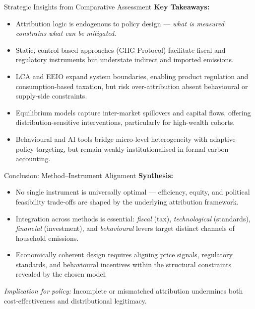 \documentclass{beamer}
\begin{document}
\begin{frame}{Strategic Insights from Comparative Assessment}
\footnotesize
\textbf{Key Takeaways:}
\begin{itemize}
  \item Attribution logic is endogenous to policy design — \textit{what is measured constrains what can be mitigated}.
  \item Static, control-based approaches (GHG Protocol) facilitate fiscal and regulatory instruments but understate indirect and imported emissions.
  \item LCA and EEIO expand system boundaries, enabling product regulation and consumption-based taxation, but risk over-attribution absent behavioural or supply-side constraints.
  \item Equilibrium models capture inter-market spillovers and capital flows, offering distribution-sensitive interventions, particularly for high-wealth cohorts.
  \item Behavioural and AI tools bridge micro-level heterogeneity with adaptive policy targeting, but remain weakly institutionalised in formal carbon accounting.
\end{itemize}
\end{frame}

\begin{frame}{Conclusion: Method–Instrument Alignment}
\footnotesize
\textbf{Synthesis:}
\begin{itemize}
  \item No single instrument is universally optimal — efficiency, equity, and political feasibility trade-offs are shaped by the underlying attribution framework.
  \item Integration across methods is essential: \textit{fiscal} (tax), \textit{technological} (standards), \textit{financial} (investment), and \textit{behavioural} levers target distinct channels of household emissions.
  \item Economically coherent design requires aligning price signals, regulatory standards, and behavioural incentives within the structural constraints revealed by the chosen model.
\end{itemize}
\vspace{0.5em}
\textit{Implication for policy:} Incomplete or mismatched attribution undermines both cost-effectiveness and distributional legitimacy.
\end{frame}
\end{document}
